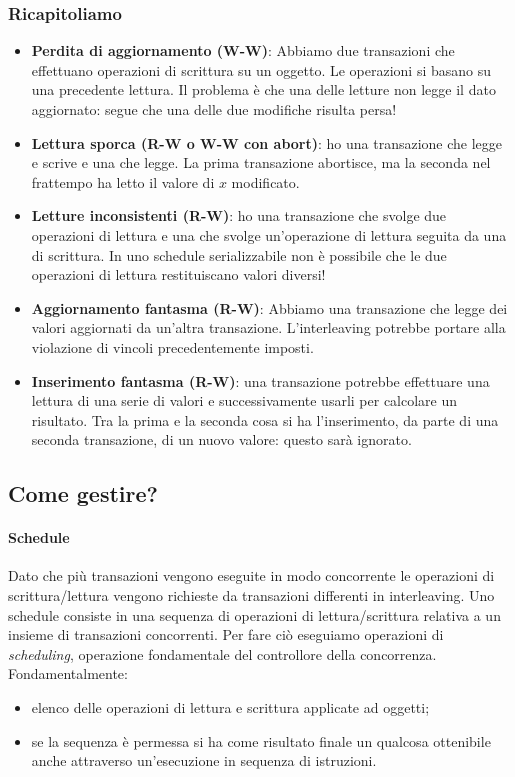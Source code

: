 \subsubsection{Ricapitoliamo}
\begin{itemize}
	\item \textbf{Perdita di aggiornamento (W-W)}: Abbiamo due transazioni che effettuano operazioni di scrittura su un oggetto. Le operazioni si basano su una precedente lettura. Il problema è che una delle letture non legge il dato aggiornato: segue che una delle due modifiche risulta persa!
	\item \textbf{Lettura sporca (R-W o W-W con abort)}: ho una transazione che legge e scrive e una che legge. La prima transazione abortisce, ma la seconda nel frattempo ha letto il valore di $x$ modificato.
	\item \textbf{Letture inconsistenti (R-W)}: ho una transazione che svolge due operazioni di lettura e una che svolge un'operazione di lettura seguita da una di scrittura. In uno schedule serializzabile non è possibile che le due operazioni di lettura restituiscano valori diversi!
	\item \textbf{Aggiornamento fantasma (R-W)}: Abbiamo una transazione che legge dei valori aggiornati da un'altra transazione. L'interleaving potrebbe portare alla violazione di vincoli precedentemente imposti.
	\item \textbf{Inserimento fantasma (R-W)}: una transazione potrebbe effettuare una lettura di una serie di valori e successivamente usarli per calcolare un risultato. Tra la prima e la seconda cosa si ha l'inserimento, da parte di una seconda transazione, di un nuovo valore: questo sarà ignorato.
\end{itemize}

\subsection{Come gestire?} 

\paragraph{Schedule} Dato che più transazioni vengono eseguite in modo concorrente le operazioni di scrittura/lettura vengono richieste da transazioni differenti in interleaving. Uno schedule consiste in una sequenza di operazioni di lettura/scrittura relativa a un insieme di transazioni concorrenti. Per fare ciò eseguiamo operazioni di \emph{scheduling}, operazione fondamentale del controllore della concorrenza. Fondamentalmente: 
\begin{itemize}
	\item elenco delle operazioni di lettura e scrittura applicate ad oggetti; 
	\item se la sequenza è permessa si ha come risultato finale un qualcosa ottenibile anche attraverso un'esecuzione in sequenza di istruzioni.
\end{itemize}

